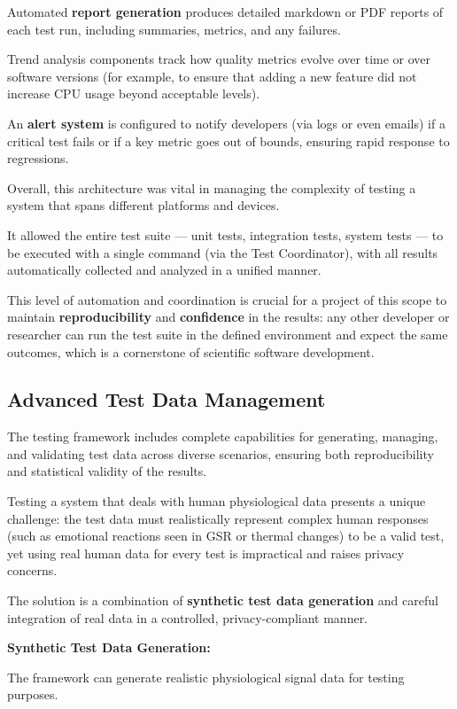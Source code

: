 {{Automated \textbf{report generation}
produces detailed markdown or PDF reports of each test run, including summaries,
metrics, and any failures.

Trend analysis components track how quality metrics evolve over time or over
software versions (for example, to ensure that adding a new feature did not
increase CPU usage beyond acceptable levels).

An \textbf{alert system}
is configured to notify developers (via logs or even emails) if a critical test
fails or if a key metric goes out of bounds, ensuring rapid response to
regressions.

Overall, this architecture was vital in managing the complexity of testing a
system that spans different platforms and devices.

It allowed the entire test suite --- unit tests, integration tests, system tests
--- to be executed with a single command (via the Test Coordinator), with all
results automatically collected and analyzed in a unified manner.

This level of automation and coordination is crucial for a project of this scope to maintain \textbf{reproducibility}
 and \textbf{confidence}
in the results: any other developer or researcher can run the test suite in the
defined environment and expect the same outcomes, which is a cornerstone of
scientific software development.

\subsection{Advanced Test Data Management}

The testing framework includes complete capabilities for generating, managing,
and validating test data across diverse scenarios, ensuring both reproducibility
and statistical validity of the results.

Testing a system that deals with human physiological data presents a unique
challenge: the test data must realistically represent complex human responses
(such as emotional reactions seen in GSR or thermal changes) to be a valid test,
yet using real human data for every test is impractical and raises privacy
concerns.

The solution is a combination of \textbf{synthetic test data generation}
 and careful integration of real data in a controlled, privacy-compliant manner.

\textbf{Synthetic Test Data Generation:}

The framework can generate realistic physiological signal data for testing
purposes.

}}
